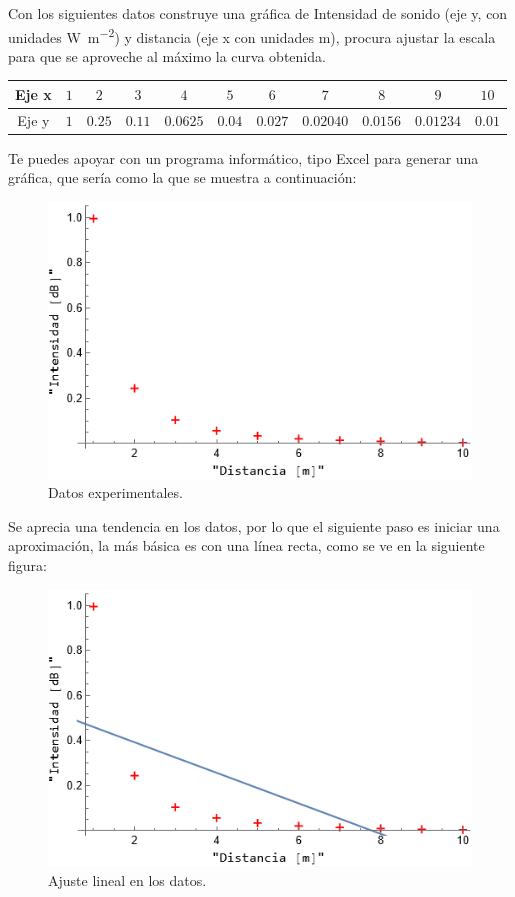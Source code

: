\documentclass[14pt]{extarticle}
\begin{document}
Con los siguientes datos construye una gráfica de Intensidad de sonido (eje y, con unidades \unit{\watt\per\square\meter}) y distancia (eje x con unidades \unit{\meter}), procura ajustar la escala para que se aproveche al máximo la curva obtenida.
\begin{table}[H]
\centering
\begin{tabular}{| c | c | c | c | c | c | c | c | c | c | c |} \hline
Eje x & $1$ & $2$ & $3$ & $4$ & $5$ & $6$ & $7$ & $8$ & $9$ & $10$ \\ \hline
Eje y & $1$ & $0.25$ & $0.11$ & $0.0625$ & $0.04$ & $0.027$ & $0.02040$ & $0.0156$ & $0.01234$ & $0.01$ \\ \hline
\end{tabular}
\end{table}
Te puedes apoyar con un programa informático, tipo Excel para generar una gráfica, que sería como la que se muestra a continuación:
\begin{figure}[H]
     \centering
     \includegraphics[scale=0.8]{Imagenes/Cuadrado_inverso_01.png}
     \caption{Datos experimentales.}
\end{figure}
Se aprecia una tendencia en los datos, por lo que el siguiente paso es iniciar una aproximación, la más básica es con una línea recta, como se ve en la siguiente figura:
\begin{figure}[H]
     \centering
     \includegraphics[scale=0.8]{Imagenes/Cuadrado_inverso_02.png}
     \caption{Ajuste lineal en los datos.}
\end{figure}
\end{document}
